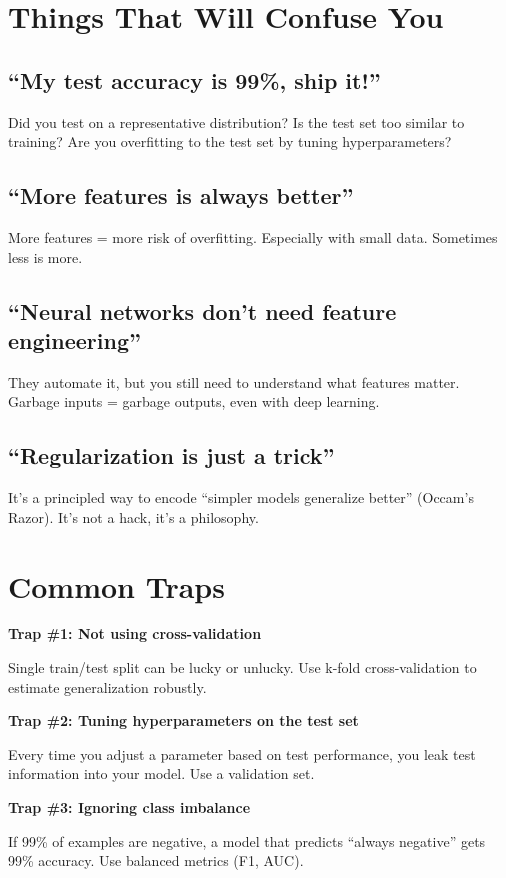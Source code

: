 \documentclass[11pt,oneside]{book}
\begin{document}
\section{Things That Will Confuse You}

\subsection{``My test accuracy is 99\%, ship it!''}
Did you test on a representative distribution? Is the test set too similar to training? Are you overfitting to the test set by tuning hyperparameters?

\subsection{``More features is always better''}
More features = more risk of overfitting. Especially with small data. Sometimes less is more.

\subsection{``Neural networks don't need feature engineering''}
They automate it, but you still need to understand what features matter. Garbage inputs = garbage outputs, even with deep learning.

\subsection{``Regularization is just a trick''}
It's a principled way to encode ``simpler models generalize better'' (Occam's Razor). It's not a hack, it's a philosophy.

\section{Common Traps}

\textbf{Trap \#1: Not using cross-validation}

Single train/test split can be lucky or unlucky. Use k-fold cross-validation to estimate generalization robustly.

\textbf{Trap \#2: Tuning hyperparameters on the test set}

Every time you adjust a parameter based on test performance, you leak test information into your model. Use a validation set.

\textbf{Trap \#3: Ignoring class imbalance}

If 99\% of examples are negative, a model that predicts ``always negative'' gets 99\% accuracy. Use balanced metrics (F1, AUC).
\end{document}
